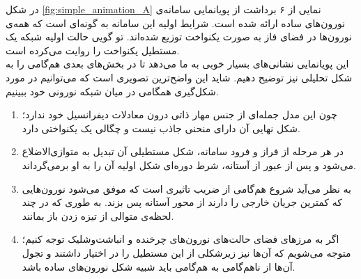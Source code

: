 در شکل 
\ref{fig:simple_animation_A}
نمایی از ۶ برداشت از پویانمایی سامانه‌ی نورون‌های ساده ارائه شده است. شرایط اولیه این سامانه به گونه‌ای است که همه‌ی نورون‌ها در فضای فاز به صورت یکنواخت توزیع شده‌اند. تو گویی حالت اولیه شبکه یک مستطیل یکنواخت را روایت می‌کرده است.\\
این پویانمایی نشانی‌های بسیار خوبی به ما می‌دهد تا در بخش‌های بعدی هم‌گامی را به شکل تحلیلی نیز توضیح دهیم. شاید این واضح‌ترین تصویری است که می‌توانیم در مورد شکل‌گیری همگامی در میان شبکه نورونی خود ببینیم.
\begin{enumerate}
	\item 
	چون این مدل جمله‌ای از جنس مهار ذاتی درون معادلات دیفرانسیل خود ندارد؛ شکل نهایی آن دارای منحنی جاذب نیست و چگالی یک یکنواختی دارد.
	\item 
	در هر مرحله از فراز و فرود سامانه، شکل مستطیلی آن تبدیل به متوازی‌الاضلاع می‌شود و پس از عبور از آستانه، شرط دوره‌ای شکل اولیه آن را به او برمی‌گرداند.
	\item 
	به نظر می‌آید شروع هم‌گامی از ضریب تاثیری است که موفق می‌شود نورون‌هایی که کمترین جریان خارجی را دارند از محور آستانه پس بزند. به طوری که در چند لحظه‌ی متوالی از تیزه زدن باز بمانند.
	\item 
	اگر به مرزهای فضای حالت‌های نورون‌های چرخنده و انباشت‌وشلیک توجه کنیم؛ متوجه می‌شویم که آن‌ها نیز زیرشکلی از این مستطیل را در اختیار داشتند و تجول آن‌ها از ناهم‌گامی به هم‌گامی باید شبیه شکل نورون‌های ساده باشد. 
\end{enumerate}

